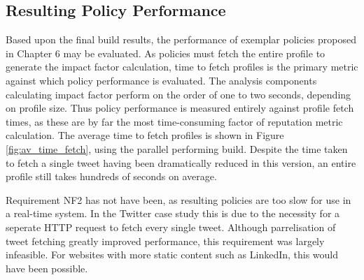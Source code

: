 



\subsection{Resulting Policy Performance}

Based upon the final build results, the performance of exemplar policies proposed in Chapter 6 may be evaluated. As policies must fetch the entire profile to generate the impact factor calculation, time to fetch profiles is the primary metric against which policy performance is evaluated. The analysis components calculating impact factor perform on the order of one to two seconds, depending on profile size. Thus policy performance is measured entirely against profile fetch times, as these are by far the most time-consuming factor of reputation metric calculation. The average time to fetch profiles is shown in Figure \ref{fig:av_time_fetch}, using the parallel performing build. Despite the time taken to fetch a single tweet having been dramatically reduced in this version, an entire profile still takes hundreds of seconds on average.

Requirement NF2 has not have been, as resulting policies are too slow for use in a real-time system. In the Twitter case study this is due to the necessity for a seperate HTTP request to fetch every single tweet. Although parrelisation of tweet fetching greatly improved performance, this requirement was largely infeasible. For websites with more static content such as LinkedIn, this would have been possible.


